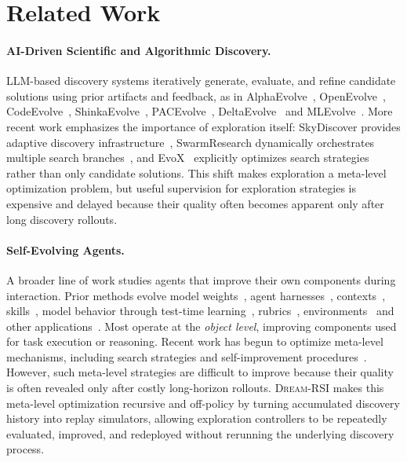 \section{Related Work}

\paragraph{AI-Driven Scientific and Algorithmic Discovery.}
LLM-based discovery systems iteratively generate, evaluate, and refine candidate solutions using prior artifacts and feedback, as in AlphaEvolve~\citep{novikov2025alphaevolve}, OpenEvolve~\citep{openevolve}, CodeEvolve~\citep{assumpccao2025codeevolve}, ShinkaEvolve~\citep{lange2026shinkaevolve}, PACEvolve~\citep{yan2026pacevolve}, DeltaEvolve~\citep{jiang2026deltaevolve} and MLEvolve~\cite{du2026mlevolve}. More recent work emphasizes the importance of exploration itself: SkyDiscover provides adaptive discovery infrastructure~\citep{liu2026skydiscover}, SwarmResearch dynamically orchestrates multiple search branches~\citep{virk2026swarmresearch}, and EvoX~\citep{liu2026evox} explicitly optimizes search strategies rather than only candidate solutions. This shift makes exploration a meta-level optimization problem, but useful supervision for exploration strategies is expensive and delayed because their quality often becomes apparent only after long discovery rollouts. 




\paragraph{Self-Evolving Agents.}
A broader line of work studies agents that improve their own components during interaction. Prior methods evolve model weights~\citep{huang2026r,huang2026g}, agent harnesses~\citep{lee2026meta,zhang2026darwin}, contexts~\citep{zhang2026agentic}, skills~\citep{zhang2026coevoskills,ouyang2026skillos,wu2026agenticrectune}, model behavior through test-time learning~\citep{wang2025thetaevolve,yuksekgonul2026learning,yan2026pacevolve++,wu2026teaching}, rubrics~\citep{xiong2026rubrics}, environments~\citep{huang2026envharness} and other applications~\citep{dai2026takes}. Most operate at the \emph{object level}, improving components used for task execution or reasoning. Recent work has begun to optimize meta-level mechanisms, including search strategies and self-improvement procedures~\citep{liu2026evox,yan2026pacevolve++,wang2026metaskill,zhang2026hyperagents,kim2026meta}. However, such meta-level strategies are difficult to improve because their quality is often revealed only after costly long-horizon rollouts. \textsc{Dream-RSI} makes this meta-level optimization recursive and off-policy by turning accumulated discovery history into replay simulators, allowing exploration controllers to be repeatedly evaluated, improved, and redeployed without rerunning the underlying discovery process.



